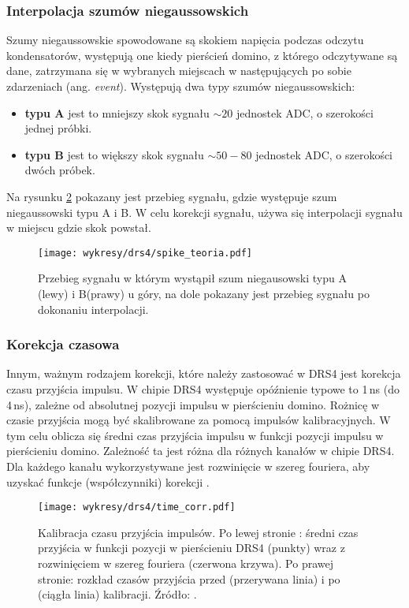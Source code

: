 \documentclass[a4paper,11pt,twoside]{article}
\begin{document}
\subsubsection{Interpolacja szumów niegaussowskich}
Szumy niegaussowskie spowodowane  są skokiem napięcia podczas odczytu kondensatorów, występują one kiedy pierścień domino, z którego odczytywane są dane, zatrzymana się w wybranych miejscach w następujących po sobie zdarzeniach (ang. \textsl{event}). Występują dwa typy szumów niegaussowskich:
\begin{itemize}
\item {\bf{typu A}} jest to mniejszy skok sygnału $\sim 20$ jednostek ADC, o szerokości jednej próbki.
\item {\bf{typu B}} jest to większy skok sygnału $\sim 50 - 80$ jednostek ADC, o szerokości dwóch próbek.
\end{itemize}
Na rysunku \ref{fig:spike_corr} pokazany jest przebieg sygnału, gdzie występuje szum niegaussowski typu A i B. W celu korekcji sygnału, używa się interpolacji sygnału w miejscu gdzie skok powstał. 
\begin{figure}[H] 
\centering
\texttt{[image: wykresy/drs4/spike\_teoria.pdf]}
\caption{Przebieg sygnału w którym wystąpił szum niegausowski typu A (lewy) i B(prawy) u góry, na dole pokazany jest przebieg sygnału po dokonaniu interpolacji.}
\label{fig:spike_corr}
\end{figure}
\subsubsection{Korekcja czasowa}
Innym, ważnym rodzajem korekcji, które należy zastosować w DRS4 jest korekcja czasu przyjścia impulsu. W chipie DRS4 występuje opóźnienie typowe to 1\,ns (do 4\,ns), zależne od absolutnej pozycji impulsu w pierścieniu domino. Rożnicę w czasie przyjścia mogą być skalibrowane za pomocą impulsów kalibracyjnych. W tym celu oblicza się średni czas przyjścia impulsu w funkcji pozycji impulsu w pierścieniu domino. Zależność ta jest różna dla różnych kanałów w chipie DRS4. Dla każdego kanału wykorzystywane jest rozwinięcie w szereg fouriera, aby uzyskać funkcje (współczynniki) korekcji \cite{drs4_magic}. 
\begin{figure}[H] 
\centering
\texttt{[image: wykresy/drs4/time\_corr.pdf]}
\caption{Kalibracja czasu przyjścia impulsów. Po lewej stronie : średni czas przyjścia w funkcji pozycji w pierścieniu DRS4 (punkty) wraz z rozwinięciem w szereg fouriera (czerwona krzywa). Po prawej stronie: rozkład czasów przyjścia przed (przerywana linia) i po (ciągła linia) kalibracji. Źródło: \cite{drs4_magic}. }
\label{fig:spike_corr}
\end{figure}
\end{document}
